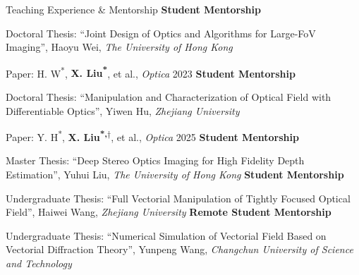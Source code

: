\begin{rubric}{Teaching Experience \& Mentorship}
    \entry*[2022 -- 2025]%
    \textbf{Student Mentorship}
    \par Doctoral Thesis: ``Joint Design of Optics and Algorithms for Large-FoV Imaging'', Haoyu Wei, \textit{The University of Hong Kong}
    \par Paper: H. W\textsuperscript{*}, \textbf{X. Liu\textsuperscript{*}}, et al., \textit{Optica} 2023
    \entry*[2021 -- 2024]%
    \textbf{Student Mentorship}
    \par Doctoral Thesis: ``Manipulation and Characterization of Optical Field with Differentiable Optics'', Yiwen Hu, \textit{Zhejiang University}
    \par Paper: Y. H\textsuperscript{*}, \textbf{X. Liu\textsuperscript{*,$\dagger$}}, et al., \textit{Optica} 2025
    \entry*[2023]%
    \textbf{Student Mentorship}
    \par Master Thesis: ``Deep Stereo Optics Imaging for High Fidelity Depth Estimation'', Yuhui Liu, \textit{The University of Hong Kong}
    \entry*[2022]%
    \textbf{Student Mentorship}
    \par Undergraduate Thesis: ``Full Vectorial Manipulation of Tightly Focused Optical Field'', Haiwei Wang, \textit{Zhejiang University}
    \entry*[2022]%
    \textbf{Remote Student Mentorship}
    \par Undergraduate Thesis: ``Numerical Simulation of Vectorial Field Based on Vectorial Diffraction Theory'', Yunpeng Wang, \textit{Changchun University of Science and Technology}
\end{rubric}